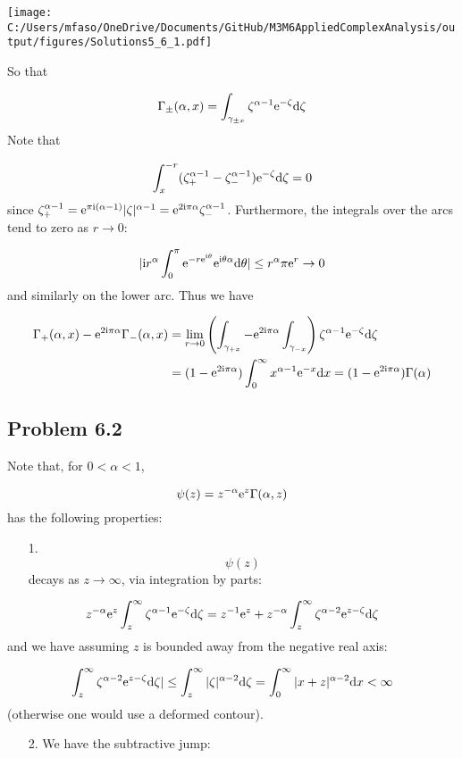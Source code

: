 \documentclass[12pt,landscape]{article}
\def\D{ {\rm d} }
\def\I{ {\rm i} }
\def\E{ {\rm e} }
\def\addtab#1={#1\;&=}
\def\ccr{\\\addtab}
\def\dx{\D x}
\def\addtab#1={#1\;&=}
\def\ccr{\\\addtab}
\begin{document}
{\texttt{[image: C:/Users/mfaso/OneDrive/Documents/GitHub/M3M6AppliedComplexAnalysis/output/figures/Solutions5\_6\_1.pdf]}

So that

\[
\Gamma_\pm(\alpha, x) = \int_{\gamma_{\pm x}} \zeta^{\alpha-1} \E^{-\zeta} \D \zeta
\]
Note that

\[
\int_x^{-r} (\zeta_+^{\alpha - 1} - \zeta_-^{\alpha -1}) \E^{-\zeta} \D\zeta = 0
\]
since $\zeta_+^{\alpha-1} = \E^{\pi \I (\alpha-1)}|\zeta|^{\alpha-1} = \E^{2 \I \pi \alpha} \zeta_-^{\alpha-1}$. Furthermore, the integrals over the arcs tend to zero as $r \rightarrow 0$:

\[
|\I r^\alpha \int_0^\pi \E^{- r \E^{\I \theta}} \E^{\I \theta \alpha} \D \theta  | \leq r^\alpha \pi \E^r  \rightarrow 0
\]
and similarly on the lower arc. Thus we have


\begin{align*}
\Gamma_+(\alpha, x)-\E^{2 \I \pi \alpha} \Gamma_-(\alpha, x) &= \lim_{r \rightarrow 0 } \left(\int_{\gamma_{+x}} - \E^{2 \I \pi \alpha} \int_{\gamma_{-x}}\right) \zeta^{\alpha-1} \E^{-\zeta} \D \zeta \ccr
 = (1 - \E^{2 \I \pi \alpha})\int_0^\infty x^{\alpha-1} \E^{-x} \dx = (1 - \E^{2 \I \pi \alpha})\Gamma(\alpha)
\end{align*}
\subsection{Problem 6.2}
Note that, for $0 < \alpha < 1$,

\[
    \psi(z) = z^{-\alpha} \E^z \Gamma(\alpha, z)
\]
has the following properties:

\begin{itemize}
\item[1. ] \[
\psi(z)
\]
decays as $z \rightarrow \infty$, via integration by parts:

\end{itemize}
\[
    z^{-\alpha} \E^z \int_z^\infty \zeta^{\alpha-1} \E^{-\zeta} \D \zeta =
    z^{-1} \E^z + z^{-\alpha} \int_z^\infty \zeta^{\alpha-2} \E^{z-\zeta} \D \zeta
\]
and we have assuming $z$ is bounded away from the negative real axis:

\[
\int_z^\infty \zeta^{\alpha-2} \E^{z-\zeta} \D \zeta| \leq \int_z^\infty |\zeta|^{\alpha-2} \D \zeta = \int_0^\infty |x+z|^{\alpha-2} \D x  < \infty
\]
(otherwise one would use a deformed contour).

\begin{itemize}
\item[2. ] We have the subtractive jump:


\end{itemize}}
\end{document}
